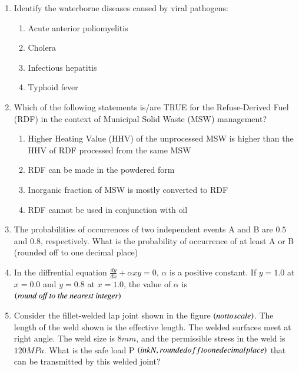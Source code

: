 \documentclass[journal,12pt,onecolumn]{IEEEtran}
\theoremstyle{remark}
\begin{document}
\begin{enumerate}
\item Identify the waterborne diseases caused by viral pathogens:

\hfill{}
\begin{enumerate}
\item Acute anterior poliomyelitis
\item Cholera
\item Infectious hepatitis
\item Typhoid fever
\end{enumerate}

\item Which of the following statements is/are TRUE for the Refuse-Derived Fuel (RDF) in the context of Municipal Solid Waste (MSW) management?

\hfill{}
\begin{enumerate}
\item Higher Heating Value (HHV) of the unprocessed MSW is higher than the HHV of RDF processed from the same MSW
\item RDF can be made in the powdered form
\item Inorganic fraction of MSW is mostly converted to RDF
\item RDF cannot be used in conjunction with oil
\end{enumerate}

\item The probabilities of occurrences of two independent events A and B are $0.5$ and $0.8$, respectively. What is the probability of occurrence of at least A or B (rounded off to one decimal place) \underline{\hspace{3cm}}

\hfill{}

\item In the diffrential equation $\frac{dy}{dx}+\alpha xy=0$, $\alpha$ is a positive constant. If $y=1.0$ at $x=0.0$ and $y=0.8$ at $x=1.0$, the value of $\alpha$ is \underline{\hspace{2cm}} $\left(\textit{round off to the nearest integer}\right)$

\hfill{}

\item Consider the fillet-welded lap joint shown in the figure $\left(not to scale\right)$. The length of the weld shown is the effective length. The welded surfaces meet at right angle. The weld size is $8 mm$, and the permissible stress in the weld is $120MPa$. What is the safe load P $\left(in kN, rounded off to one decimal place\right)$ that can be transmitted by this welded joint? \underline{\hspace{2cm}}


\end{enumerate}
\end{document}
